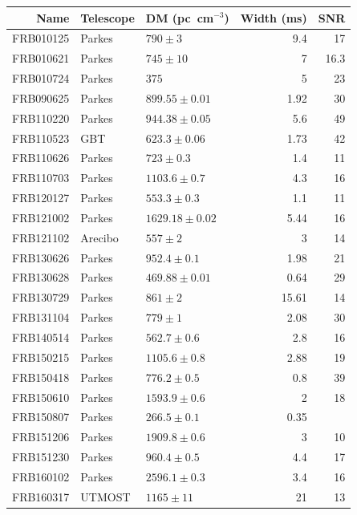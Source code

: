 \documentclass[a4paper,fleqn,usenatbib]{mnras}
\begin{document}
\begin{table}
\centering
\begin{tabular}{ r l l r r }
Name      & Telescope & DM (pc~cm$^{-3}$)& Width (ms) & SNR  \\
\hline
FRB010125 & Parkes  & $790 \pm 3$        &  9.4 	&	17   \\ 
FRB010621 & Parkes  & $745 \pm 10$       &  7		&	16.3 \\
FRB010724 & Parkes  & $375$              &  5		&	23   \\ 
FRB090625 & Parkes  & $899.55 \pm 0.01$  &  1.92	&	30   \\ 
FRB110220 & Parkes  & $944.38 \pm 0.05$  &  5.6		&	49   \\ 
FRB110523 & GBT     & $623.3 \pm 0.06$   &  1.73	&	42   \\ 
FRB110626 & Parkes  & $723 \pm 0.3$      &  1.4		&	11   \\ 
FRB110703 & Parkes  & $1103.6 \pm 0.7$   &  4.3		&	16   \\ 
FRB120127 & Parkes  & $553.3 \pm 0.3$    &  1.1		&	11   \\ 
FRB121002 & Parkes  & $1629.18 \pm 0.02$ &  5.44	&	16   \\ 
FRB121102 & Arecibo & $557 \pm 2$        &  3		&	14   \\ 
FRB130626 & Parkes  & $952.4 \pm 0.1$    &  1.98	&	21   \\ 
FRB130628 & Parkes  & $469.88 \pm 0.01$  &  0.64	&	29   \\ 
FRB130729 & Parkes  & $861 \pm 2$        &  15.61	&	14   \\ 
FRB131104 & Parkes  & $779 \pm 1$        &  2.08	&	30   \\ 
FRB140514 & Parkes  & $562.7 \pm 0.6$    &  2.8		&	16   \\ 
FRB150215 & Parkes  & $1105.6 \pm 0.8$   &  2.88	&	19   \\ 
FRB150418 & Parkes  & $776.2 \pm 0.5$    &  0.8		&	39   \\ 
FRB150610 & Parkes  & $1593.9 \pm 0.6$   &  2		&	18   \\ 
FRB150807 & Parkes  & $266.5 \pm 0.1$    &  0.35	&	     \\ 
FRB151206 & Parkes  & $1909.8 \pm 0.6$   &  3		&	10   \\ 
FRB151230 & Parkes  & $960.4 \pm 0.5$    &  4.4		&	17   \\ 
FRB160102 & Parkes  & $2596.1 \pm 0.3$   &  3.4		&	16   \\ 
FRB160317 & UTMOST  & $1165 \pm 11$      &  21		&	13   \\ 

\end{tabular}
\end{table}
\end{document}
